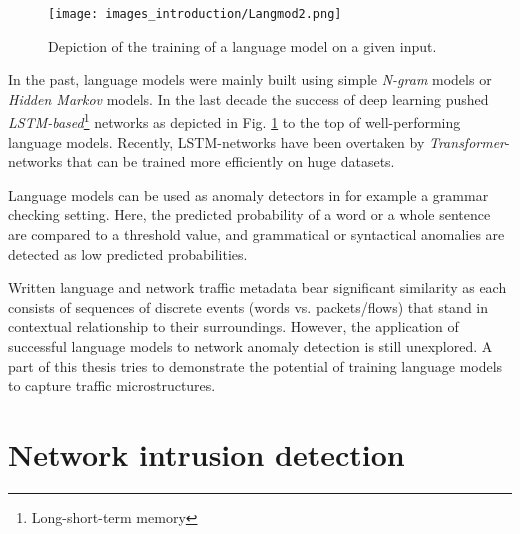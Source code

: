 \begin{figure}
\centering
\texttt{[image: images\_introduction/Langmod2.png]}
\caption{Depiction of the training of a language model on a given input.}\label{Fig:Langmod}
\end{figure}

In the past, language models were mainly built using simple \textit{N-gram} models or \textit{Hidden Markov} models. In the last decade the success of deep learning pushed \textit{LSTM-based}\footnote{Long-short-term memory} networks as depicted in Fig. \ref{Fig:Langmod} to the top of well-performing language models. Recently, LSTM-networks have been overtaken by \textit{Transformer}-networks that can be trained more efficiently on huge datasets. 

Language models can be used as anomaly detectors in for example a grammar checking setting. Here, the predicted probability of a word or a whole sentence are compared to a threshold value, and grammatical or syntactical anomalies are detected as low predicted probabilities. 

Written language and network traffic metadata bear significant similarity as each consists of sequences of discrete events (words vs. packets/flows) that stand in contextual relationship to their surroundings. However, the application of successful language models to network anomaly detection is still unexplored. A part of this thesis tries to demonstrate the potential of training language models to capture traffic microstructures.

\section{Network intrusion detection}



